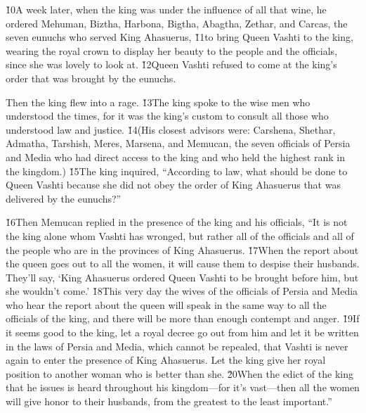 \v{10}A week later, when the king was under the influence of all that wine, he ordered Mehuman, Biztha, Harbona, Bigtha, Abagtha, Zethar, and Carcas, the seven eunuchs who served King Ahasuerus, \v{11}to bring Queen Vashti to the king, wearing the royal crown to display her beauty to the people and the officials, since she was lovely to look at. \v{12}Queen Vashti refused to come at the king's order that was brought by the eunuchs.

Then the king flew into a rage. \v{13}The king spoke to the wise men who understood the times, for it was the king's custom to consult all those who understood law and justice. \v{14}(His closest advisors were: Carshena, Shethar, Admatha, Tarshish, Meres, Marsena, and Memucan, the seven officials of Persia and Media who had direct access to the king and who held the highest rank in the kingdom.) \v{15}The king inquired, ``According to law, what should be done to Queen Vashti because she did not obey the order of King Ahasuerus that was delivered by the eunuchs?''

\v{16}Then Memucan replied in the presence of the king and his officials, ``It is not the king alone whom Vashti has wronged, but rather all of the officials and all of the people who are in the provinces of King Ahasuerus. \v{17}When the report about the queen goes out to all the women, it will cause them to despise their husbands. They'll say, `King Ahasuerus ordered Queen Vashti to be brought before him, but she wouldn't come.' \v{18}This very day the wives of the officials of Persia and Media who hear the report about the queen will speak in the same way to all the officials of the king, and there will be more than enough contempt and anger. \v{19}If it seems good to the king, let a royal decree go out from him and let it be written in the laws of Persia and Media, which cannot be repealed, that Vashti is never again to enter the presence of King Ahasuerus. Let the king give her royal position to another woman who is better than she. \v{20}When the edict of the king that he issues is heard throughout his kingdom---for it's vast---then all the women will give honor to their husbands, from the greatest to the least important.''

